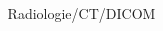 


\begin{frame}[t] %

\begin{columns}[t] %

\begin{column}{.025\textwidth}\end{column} %

\begin{column}{.465\textwidth} %


\begin{block}{Radiologie/CT/DICOM}
    



\end{block}


\end{column}
\end{columns}
\end{frame}
